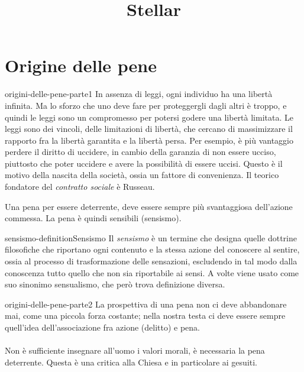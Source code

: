 \documentclass[preview]{standalone}
\begin{document}
\title{Stellar}
\genpage

\section{Origine delle pene}

\begin{snippet}{origini-delle-pene-parte1}
    In assenza di leggi, ogni individuo ha una libertà infinita. Ma lo sforzo che uno deve fare
    per proteggergli dagli altri è troppo, e quindi le leggi sono un compromesso per potersi godere una libertà
    limitata. Le leggi sono dei vincoli, delle limitazioni di libertà, che cercano di massimizzare
    il rapporto fra la libertà garantita e la libertà persa.
    Per esempio, è più vantaggio perdere il diritto di uccidere, in cambio della garanzia
    di non essere ucciso, piuttosto che poter uccidere e avere la possibilità di essere uccisi.
    Questo è il motivo della nascita della società, ossia un fattore di convenienza.
    Il teorico fondatore del \textit{contratto sociale} è Russeau.
    
    Una pena per essere deterrente, deve essere sempre più svantaggiosa dell'azione commessa.
    La pena è quindi sensibili (sensismo).
\end{snippet}

\begin{snippetdefinition}{sensismo-definition}{Sensismo}
    Il \textit{sensismo} è un termine che designa quelle
    dottrine filosofiche che riportano ogni contenuto e la stessa azione del
    conoscere al sentire, ossia al processo di trasformazione delle sensazioni,
    escludendo in tal modo dalla conoscenza tutto quello che non sia riportabile ai sensi.
    A volte viene usato come suo sinonimo sensualismo, che però trova definizione diversa.
\end{snippetdefinition}

\begin{snippet}{origini-delle-pene-parte2}
    La prospettiva di una pena non ci deve abbandonare mai, come una piccola forza costante;
    nella nostra testa ci deve essere sempre quell'idea dell'associazione fra azione (delitto) e pena.
    \\\\
    Non è sufficiente insegnare all'uomo i valori morali, è necessaria la pena deterrente.
    Questa è una critica alla Chiesa e in particolare ai gesuiti. 
\end{snippet}
\end{document}
